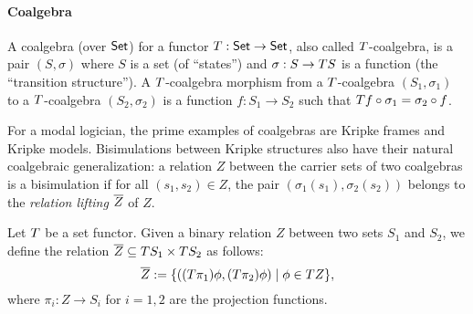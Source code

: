 \documentclass{book}
\begin{document}
\paragraph{Coalgebra}
A coalgebra (over $\mathsf{Set}$) for a functor $T:\mathsf{Set} \to \mathsf{Set}$, 
also called $T$-coalgebra, is a pair 
$(S,\sigma)$ where $S$ is a set (of ``states'') and 
$\sigma:S \to T S$ is a function (the ``transition structure'').
A $T$-coalgebra morphism from a $T$-coalgebra
$(S_1,\sigma_1)$ to a $T$-coalgebra $(S_2,\sigma_2)$ 
is a function $f:S_1 \to
S_2$ such that $T f \circ \sigma_1 = \sigma_2 \circ f$.
 
For a modal logician, the prime examples of coalgebras are Kripke frames
and Kripke models.
Bisimulations between Kripke structures also have their natural coalgebraic
generalization: a relation $Z$ between the carrier sets of two
coalgebras is a bisimulation if for all $(s_{1},s_{2})\in Z$, the pair
$(\sigma_1(s_1),\sigma_2(s_2))$ belongs to the \emph{relation lifting}
$\overline{Z}$ of $Z$.

\begin{definition} \label{d:rellift}
Let $T$ be a set functor.
Given a binary relation $Z$ between two sets $S_1$
and $S_2$, we define the relation $\overline{Z} \subseteq T S_1 \times T S_2$
as follows:
\[
\overline{Z} := \{ ((T\pi_{1}) \phi, (T\pi_{2})\phi) \mid \phi \in T Z \},
\]
where $\pi_i: Z \to S_i$ for $i=1,2$ are the projection functions.
\end{definition}
\end{document}
